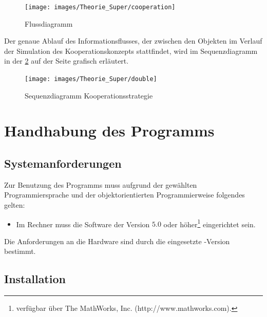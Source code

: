 \begin{figure}[h!]
	\begin{center}
	\texttt{[image: images/Theorie\_Super/cooperation]}
	\end{center}
\caption{Flussdiagramm}
\label{fig:coop}
\end{figure}

Der genaue Ablauf des Informationsflusses, der zwischen den Objekten im Verlauf
der Simulation des Kooperationskonzepts stattfindet, wird im Sequenzdiagramm in
der \cref{fig:uml_coop} auf der Seite \pageref{fig:uml_coop} grafisch
erl\"autert.
\begin{figure}[h]
	\begin{center}
	\texttt{[image: images/Theorie\_Super/double]}
	\end{center}
\caption{Sequenzdiagramm Kooperationsstrategie}
\label{fig:uml_coop}
\end{figure}



\section{Handhabung des Programms}
\label{sc:handhabung}

\subsection{Systemanforderungen}

Zur Benutzung des Programms muss aufgrund der gewählten Programmiersprache und
der objektorientierten Programmierweise folgendes gelten:

\begin{itemize}
	\item Im Rechner muss die Software \matlab der Version $5.0$ oder
	höher\footnote{ \matlab verfügbar über The MathWorks, Inc.
	(http://www.mathworks.com).} eingerichtet sein.
\end{itemize}

Die Anforderungen an die Hardware sind durch die eingesetzte \matlab-Version
bestimmt.

\subsection{Installation}

